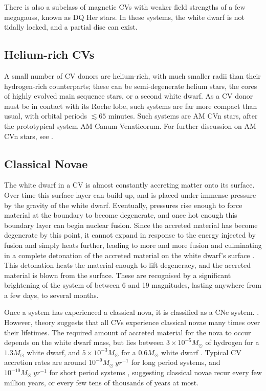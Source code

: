 There is also a subclass of magnetic CVs with weaker field strengths of a few megagauss, known as DQ Her stars. In these systems, the white dwarf is not tidally locked, and a partial disc can exist.

\subsection{Helium-rich CVs}
\label{sect:introduction:AM CVn}

A small number of CV donors are helium-rich, with much smaller radii than their hydrogen-rich counterparts; these can be semi-degenerate helium stars, the cores of highly evolved main sequence stars, or a second white dwarf. 
As a CV donor must be in contact with its Roche lobe, such systems are far more compact than usual, with orbital periods $\lesssim 65$ minutes. Such systems are AM CVn stars, after the prototypical system AM Canum Venaticorum. For further discussion on AM CVn stars, see \citep{solheim2010}.


\subsection{Classical Novae}
\label{sect:introduction:classical novae}

The white dwarf in a CV is almost constantly accreting matter onto its surface. Over time this surface layer can build up, and is placed under immense pressure by the gravity of the white dwarf. Eventually, pressures rise enough to force material at the boundary to become degenerate, and once hot enough this boundary layer can begin nuclear fusion. 
Since the accreted material has become degenerate by this point, it cannot expand in response to the energy injected by fusion and simply heats further, leading to more and more fusion and culminating in a complete detonation of the accreted material on the white dwarf's surface \citep{warner1995}. This detonation heats the material enough to lift degeneracy, and the accreted material is blown from the surface.
These are recognised by a significant brightening of the system of between 6 and 19 magnitudes, lasting anywhere from a few days, to several months. 

Once a system has experienced a classical nova, it is classified as a CNe system. \citep{warner1995}. However, theory suggests that all CVs experience classical novae many times over their lifetimes. The required amount of accreted material for the nova to occur depends on the white dwarf mass, but lies between $3\times10^{-5} M_\odot$ of hydrogen for a $1.3 M_\odot$ white dwarf, and $5\times10^{-3} M_\odot$ for a $0.6 M_\odot$ white dwarf \citep{hellier2001}. Typical CV accretion rates are around $10^{-9} M_\odot\ yr^{-1}$ for long period systems, and $10^{-10} M_\odot\ yr^{-1}$ for short period systems \citep{hellier2001, Pala2021}, suggesting classical novae recur every few million years, or every few tens of thousands of years at most.

